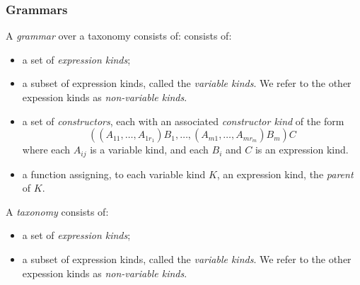 \begin{frame}
\frametitle{Grammars}
A \emph{grammar} over a taxonomy consists of: consists of:
\begin{itemize}
\item a set of \emph{expression kinds};
\item a subset of expression kinds, called the \emph{variable kinds}.  We refer to the other expession kinds as \emph{non-variable kinds}.
\item a set of \emph{constructors}, each with an associated \emph{constructor kind} of the form
\begin{equation}
\label{eq:conkind}
 ((A_{11}, \ldots, A_{1r_1}) B_1, \ldots, (A_{m1}, \ldots, A_{mr_m}) B_m) C
\end{equation}
where each $A_{ij}$ is a variable kind, and each $B_i$ and $C$ is an expression kind.
\item a function assigning, to each variable kind $K$, an expression kind, the \emph{parent} of $K$.
\end{itemize}
\end{frame}

\begin{frame}[fragile]
A \emph{taxonomy } consists of:
\begin{itemize}
\item a set of \emph{expression kinds};
\item a subset of expression kinds, called the \emph{variable kinds}.  We refer to the other expession kinds as \emph{non-variable kinds}.
\end{itemize}

\begin{code}%
\>  \AgdaSymbol{:}  \<%
\\
\>[0]\<[2]%
\>[2]\<%
\\
\>[2]\<[4]%
\>[4] \AgdaSymbol{:} \<%
\\
\>[2]\<[4]%
\>[4] \AgdaSymbol{:} \<%
\\
%
\\
\>[0]\<[2]%
\>[2]  \AgdaSymbol{:}  \<%
\\
\>[2]\<[4]%
\>[4] \AgdaSymbol{:}   \<%
\\
\>[2]\<[4]%
\>[4] \AgdaSymbol{:}   \<%
\end{code}
\end{frame}


